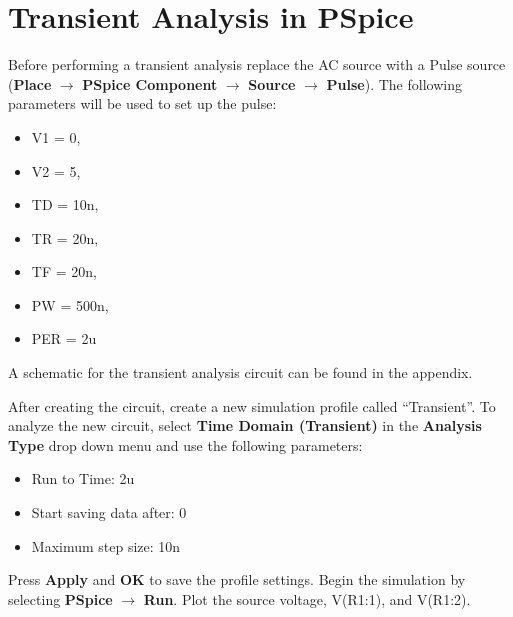\documentclass[12pt]{../manual}
\begin{document}
%
\newpage
\section{Transient Analysis in PSpice}
Before performing a transient analysis replace the AC source with a Pulse source (\textbf{Place} $\to$ \textbf{PSpice Component} $\to$ \textbf{Source} $\to$ \textbf{Pulse}). The following parameters will be used to set up the pulse: 
\begin{itemize}
\item V1 = 0, 
\item V2 = 5, 
\item TD = 10n, 
\item TR = 20n, 
\item TF = 20n, 
\item PW = 500n, 
\item PER = 2u
\end{itemize}
A schematic for the transient analysis circuit can be found in the appendix.

After creating the circuit, create a new simulation profile called ``Transient''. To analyze the new circuit, select \textbf{Time Domain (Transient)} in the \textbf{Analysis Type} drop down menu and use the following parameters:
\begin{itemize}
\item Run to Time: 2u
\item Start saving data after: 0
\item Maximum step size: 10n
\end{itemize}
Press \textbf{Apply} and \textbf{OK} to save the profile settings. Begin the simulation by selecting \textbf{PSpice} $\to$ \textbf{Run}. Plot the source voltage, V(R1:1), and V(R1:2).

%
\newpage
\end{document}

